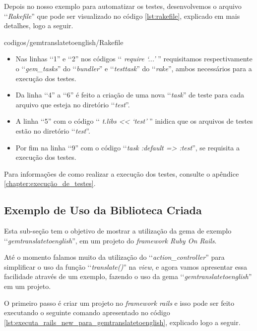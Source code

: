 Depois no nosso exemplo para automatizar os testes, desenvolvemos o arquivo ‘‘\emph{Rakefile}'' que pode
ser visualizado no código \ref{lst:rakefile}, explicado em mais detalhes, logo a seguir.


{codigos/gemtranslatetoenglish/Rakefile}

\begin{itemize}

\item Nas linhas ‘‘1'' e ‘‘2'' nos códigos ‘‘ \emph{require ‘...'} '' requisitamos respectivamente o
 ‘‘\emph{gem\_tasks}'' do ‘‘\emph{bundler}'' e ‘‘\emph{testtask}'' do ‘‘\emph{rake}'', ambos necessários para
 a execução dos testes.

 \item Da linha ‘‘4'' a ‘‘6'' é feito a criação de uma nova ‘‘\emph{task}'' de teste para cada arquivo
 que esteja no diretório ‘‘\emph{test}''.

 \item A linha ‘‘5'' com o código ‘‘ \emph{t.libs << ‘test'} '' inidica que os arquivos de testes estão no
 diretório ‘‘\emph{test}''.

 \item Por fim na linha ‘‘9'' com o código ‘‘\emph{task :default => :test}'', se requisita a execução
 dos testes.

\end{itemize}

Para informações de como realizar a execução dos testes, consulte o apêndice
\ref{chapter:execução_de_testes}.


\subsection{Exemplo de Uso da Biblioteca Criada}
\label{subsection:exemplo_de_uso_da_biblioteca_criada}


Esta sub-seção tem o objetivo de mostrar a utilização da gema de exemplo ‘‘\emph{gemtranslatetoenglish}'',
em um projeto do \emph{framework Ruby On Rails}.

Até o momento falamos muito da utilização do ‘‘\emph{action\_controller}'' para simplificar o uso da função
‘‘\emph{translate()}'' na \emph{view}, e agora vamos apresentar essa facilidade através de um exemplo,
fazendo o uso da gema ‘‘\emph{gemtranslatetoenglish}'' em um projeto.

O primeiro passo é criar um projeto no \emph{framework rails} e isso pode ser feito executando
o seguinte comando apresentado no código \ref{lst:executa_rails_new_para_gemtranslatetoenglish},
explicado logo a seguir.

